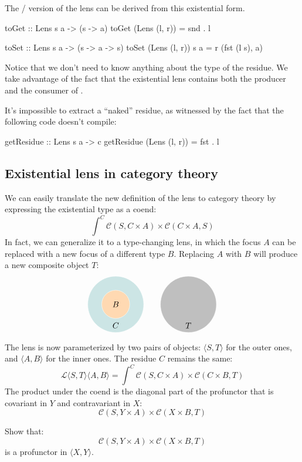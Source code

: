 \documentclass[DaoFP]{subfiles}
\begin{document}
The / version of the lens can be derived from this existential form.
\begin{haskell}
toGet :: Lens s a -> (s -> a)
toGet (Lens (l, r)) = snd . l

toSet :: Lens s a -> (s -> a -> s)
toSet (Lens (l, r)) s a = r (fst (l s), a)
\end{haskell}

Notice that we don't need to know anything about the type of the residue. We take advantage of the fact that the existential lens contains both the producer and the consumer of .

It's impossible to extract a ``naked'' residue, as witnessed by the fact that the following code doesn't compile:
\begin{haskell}
getResidue :: Lens s a -> c
getResidue (Lens (l, r)) = fst . l
\end{haskell}

\subsection{Existential lens in category theory}

We can easily translate the new definition of the lens to category theory by expressing the existential type as a coend:
\[ \int^{C} \mathcal{C}(S, C \times A) \times  \mathcal{C}(C \times A, S) \]
In fact, we can generalize it to a type-changing lens, in which the focus $A$ can be replaced with a new focus of a different type $B$. Replacing $A$ with $B$ will produce a new composite object $T$:
\[
\begin{tikzpicture}
\filldraw[fill=blue!50!green!20, draw=white] (0, 0) circle (1.2);
\filldraw[fill=orange!30, draw=white] (0, 0) circle (0.6);
\node at (0, 0) {$B$};
\node at (0, -0.9) {$C$};
\end{tikzpicture}
\hspace{20pt}
\begin{tikzpicture}
\filldraw[fill=gray!50, draw=white] (0, 0) circle (1.2);
\node at (0, -0.9) {$T$};
\end{tikzpicture}
\]

The lens is now parameterized by two pairs of objects: $\langle S, T\rangle$ for the outer ones, and $ \langle A, B \rangle$ for the inner ones. The residue $C$ remains the same:
\[ \mathcal{L}\langle S, T\rangle \langle A, B \rangle = \int^{C} \mathcal{C}(S, C \times A) \times  \mathcal{C}(C \times B, T) \]
The product under the coend is the diagonal part of the profunctor that is covariant in $Y$ and contravariant in $X$:
\[ \mathcal{C}(S, Y \times A) \times  \mathcal{C}(X \times B, T) \]
\begin{exercise}
Show that:
\[ \mathcal{C}(S, Y \times A) \times  \mathcal{C}(X \times B, T) \]
is a profunctor in $\langle X, Y\rangle$.
\end{exercise}
\end{document}
